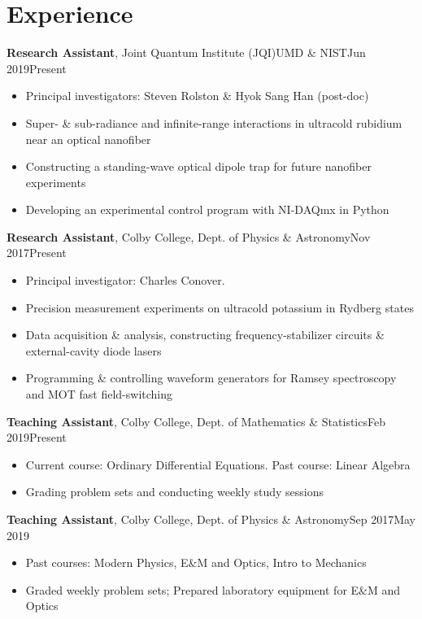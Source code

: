 \documentclass[a4paper, 9pt]{article}
\begin{document}
	\section*{\normalsize{{\color{colby}\textbf{Experience}}}}
	\textbf{Research Assistant},  {Joint Quantum Institute (JQI)\textemdash UMD \&  NIST}\hfill Jun 2019\textemdash Present
	\begin{itemize}[noitemsep, nolistsep]
		\setlength{\itemindent}{0.2in}
		\item Principal investigators: Steven Rolston \& Hyok Sang Han (post-doc)
		\item Super- \& sub-radiance and infinite-range interactions in ultracold rubidium near an optical nanofiber
		\item Constructing a standing-wave optical dipole trap for future nanofiber experiments
		\item Developing an experimental control program with NI-DAQmx in Python
	\end{itemize}
	\indent \indent \textbf{Research Assistant}, {Colby College, Dept. of Physics \& Astronomy}\hfill Nov 2017\textemdash Present
	\begin{itemize}[noitemsep, nolistsep]
		\setlength{\itemindent}{0.2in}
		\item Principal investigator: Charles Conover.
		\item Precision measurement experiments on ultracold potassium in Rydberg states
		\item Data acquisition \& analysis, constructing frequency-stabilizer circuits \& external-cavity diode lasers
		\item Programming \& controlling waveform generators for Ramsey spectroscopy and MOT fast field-switching

	\end{itemize}	
	\indent \indent \textbf{Teaching Assistant}, {Colby College, Dept. of Mathematics \& Statistics}\hfill Feb 2019\textemdash Present 
	\begin{itemize}[noitemsep, nolistsep]
		\setlength{\itemindent}{0.2in}
		\item Current course: Ordinary Differential Equations. Past course: Linear Algebra
		\item Grading problem sets and conducting weekly study sessions 
	\end{itemize}
	\indent \indent \textbf{Teaching Assistant}, {Colby College, Dept. of Physics \& Astronomy}\hfill Sep 2017\textemdash May 2019
	\begin{itemize}[noitemsep, nolistsep]
		\setlength{\itemindent}{0.2in}
		\item Past courses: Modern Physics, E\&M and Optics, Intro to Mechanics
		\item Graded weekly problem sets; Prepared laboratory equipment for E\&M and Optics
	\end{itemize}
\end{document}
